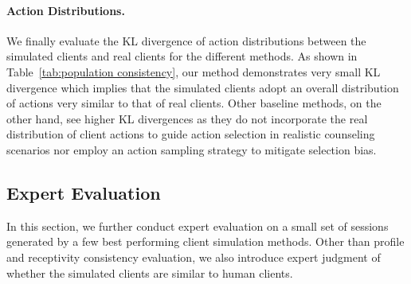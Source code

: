 \paragraph{Action Distributions.} We finally evaluate the KL divergence of action distributions between the simulated clients and real clients for the different methods. As shown in Table~\ref{tab:population consistency}, our method demonstrates very small KL divergence which implies that the simulated clients adopt an overall distribution of actions very similar to that of real clients. Other baseline methods, on the other hand, see higher KL divergences as they do not incorporate the real distribution of client actions to guide action selection in realistic counseling scenarios nor employ an action sampling strategy to mitigate selection bias.


\subsection{Expert Evaluation}
\label{sec:exp_eval}

In this section, we further conduct expert evaluation on a small set of sessions generated by a few best performing client simulation methods. Other than profile and receptivity consistency evaluation, we also introduce expert judgment of whether the simulated clients are similar to human clients.  

